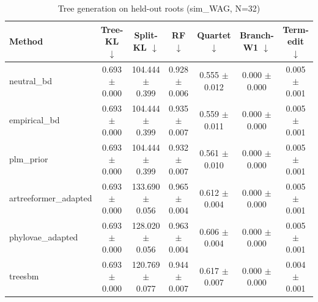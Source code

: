 \begin{table}[t]\centering
\caption{Tree generation on held-out roots (sim_WAG, N=32)}
\begin{tabular}{lcccccc}
\toprule
Method & Tree-KL $\downarrow$ & Split-KL $\downarrow$ & RF $\downarrow$ & Quartet $\downarrow$ & Branch-W1 $\downarrow$ & Term-edit $\downarrow$ \\
\midrule
neutral\_bd & 0.693 $\pm$ 0.000 & 104.444 $\pm$ 0.399 & 0.928 $\pm$ 0.006 & 0.555 $\pm$ 0.012 & 0.000 $\pm$ 0.000 & 0.005 $\pm$ 0.001 \\
empirical\_bd & 0.693 $\pm$ 0.000 & 104.444 $\pm$ 0.399 & 0.935 $\pm$ 0.007 & 0.559 $\pm$ 0.011 & 0.000 $\pm$ 0.000 & 0.005 $\pm$ 0.001 \\
plm\_prior & 0.693 $\pm$ 0.000 & 104.444 $\pm$ 0.399 & 0.932 $\pm$ 0.007 & 0.561 $\pm$ 0.010 & 0.000 $\pm$ 0.000 & 0.005 $\pm$ 0.001 \\
artreeformer\_adapted & 0.693 $\pm$ 0.000 & 133.690 $\pm$ 0.056 & 0.965 $\pm$ 0.004 & 0.612 $\pm$ 0.004 & 0.000 $\pm$ 0.000 & 0.005 $\pm$ 0.001 \\
phylovae\_adapted & 0.693 $\pm$ 0.000 & 128.020 $\pm$ 0.056 & 0.963 $\pm$ 0.004 & 0.606 $\pm$ 0.004 & 0.000 $\pm$ 0.000 & 0.005 $\pm$ 0.001 \\
treesbm & 0.693 $\pm$ 0.000 & 120.769 $\pm$ 0.077 & 0.944 $\pm$ 0.007 & 0.617 $\pm$ 0.007 & 0.000 $\pm$ 0.000 & 0.004 $\pm$ 0.001 \\
\bottomrule
\end{tabular}
\end{table}